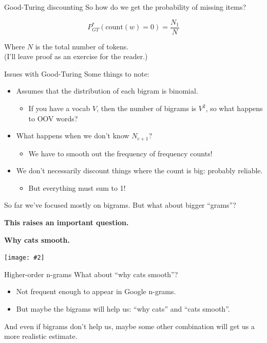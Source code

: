\documentclass{beamer}
\newcommand{\placard}[1]{
  \begin{frame}
    \begin{center}
      \huge
      \textbf{#1}
    \end{center}
  \end{frame}
}
\newcommand{\pagestep}[2]{
  \begin{frame}[t]
    \begin{minipage}[t][0.26\textheight][t]{\textwidth}
      \begin{center}
        \huge
        \textbf{#1}
      \end{center}
    \end{minipage}
    
    \begin{minipage}[t][0.7\textheight][c]{\textwidth}
      \begin{center}
        \texttt{[image: \#2]}
      \end{center}
    \end{minipage}
  \end{frame}
}
\begin{document}
\begin{frame}{Good-Turing discounting}
  So how do we get the probability of missing items?\pause
  \begin{block}

    \[P^*_{GT}(\mathrm{count}(w) = 0) = \frac{N_1}{N}\]
  \end{block}
  Where $N$ is the total number of tokens.\\
  (I'll leave proof as an exercise for the reader.)
\end{frame}


\begin{frame}{Issues with Good-Turing}
  Some things to note:
  \begin{itemize}
  \item Assumes that the distribution of each bigram is binomial.\pause
    \begin{itemize}
    \item If you have a vocab $V$, then the number of bigrams is $V^2$, 
      so what happens to OOV words?\pause
    \end{itemize}
  \item What happens when we don't know $N_{c+1}$? \pause
    \begin{itemize}
    \item We have to smooth out the frequency of frequency counts!
    \end{itemize}\pause
  \item We don't necessarily discount things where the count is big:
    probably reliable.\pause
    \begin{itemize}
    \item But everything must sum to 1!
    \end{itemize}
  \end{itemize}
\end{frame}

\begin{frame}
  \begin{center}
    \huge
    So far we've focused mostly on bigrams. But what about bigger ``grams''?
  \end{center}
\end{frame}

\placard{This raises an important question.}

\pagestep{Why cats smooth.}{images/622119.jpg}

\begin{frame}{Higher-order n-grams}
  What about ``why cats smooth''?\pause
  \begin{itemize}
  \item Not frequent enough to appear in Google n-grams.\pause
  \item But maybe the bigrams will help us: ``why cats'' and ``cats smooth''.
  \end{itemize}\pause
  And even if bigrams don't help us, maybe some other combination will
  get us a more realistic estimate.
\end{frame}
\end{document}
